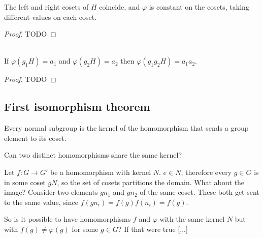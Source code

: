 \begin{theorem*}
  The left and right cosets of $H$ coincide, and $\varphi$ is constant on the
  cosets, taking different values on each coset.
\end{theorem*}

\begin{proof}
  TODO
\end{proof}


\begin{theorem*}~\\
  If $\varphi(g_1H) = a_1$ and $\varphi(g_2H) = a_2$ then
  $\varphi(g_1g_2H) = a_1a_2$.
\end{theorem*}

\begin{proof}
  TODO
\end{proof}
\newpage
\subsection{First isomorphism theorem}


Every normal subgroup is the kernel of the homomorphism that sends a group element to its coset.

Can two distinct homomorphisms share the same kernel?

Let $f: G \rightarrow G'$ be a homomorphism with kernel $N$. $e \in N$,
therefore every $g \in G$ is in some coset $gN$, so the set of cosets
partitions the domain. What about the image? Consider two elements $gn_1$ and
$gn_2$ of the same coset. These both get sent to the same value, since
$f(gn_i) = f(g)f(n_i) = f(g)$.

So is it possible to have homomorphisms $f$ and $\varphi$ with the same kernel
$N$ but with $f(g) \neq \varphi(g)$ for some $g \in G$? If that were true [...]
